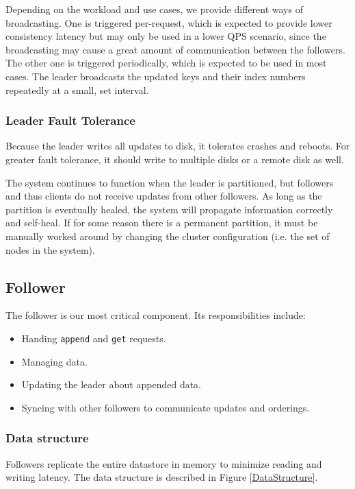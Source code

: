 \documentclass[11pt,english,twocolumn]{article}
\begin{document}
Depending on the workload and use cases, we provide different ways of
broadcasting. One is triggered per-request, which is expected to provide lower
consistency latency but may only be used in a lower QPS scenario, since the
broadcasting may cause a great amount of communication between the followers.
The other one is triggered periodically, which is expected to be used in most
cases. The leader broadcasts the updated keys and their index numbers repeatedly
at a small, set interval.

\subsubsection{Leader Fault Tolerance}
Because the leader writes all updates to disk, it tolerates crashes and reboots.
For greater fault tolerance, it should write to multiple disks or a remote disk
as well.

The system continues to function when the leader is partitioned, but followers
and thus clients do not receive updates from other followers. As long as the
partition is eventually healed, the system will propagate information correctly
and self-heal. If for some reason there is a permanent partition, it must be
manually worked around by changing the cluster configuration (i.e. the set of
nodes in the system).

\subsection{Follower}
The follower is our most critical component. Its responsibilities include:

\begin{itemize}
	\item Handing \texttt{append} and \texttt{get} requests. \vspace{-0.4cm}
	\item Managing data. \vspace{-0.4cm}
	\item Updating the leader about appended data. \vspace{-0.4cm}
	\item Syncing with other followers to communicate updates and orderings.
\end{itemize}

\subsubsection{Data structure}
Followers replicate the entire datastore in memory to minimize
reading and writing latency. The data structure is described in Figure \ref{DataStructure}.
\end{document}
